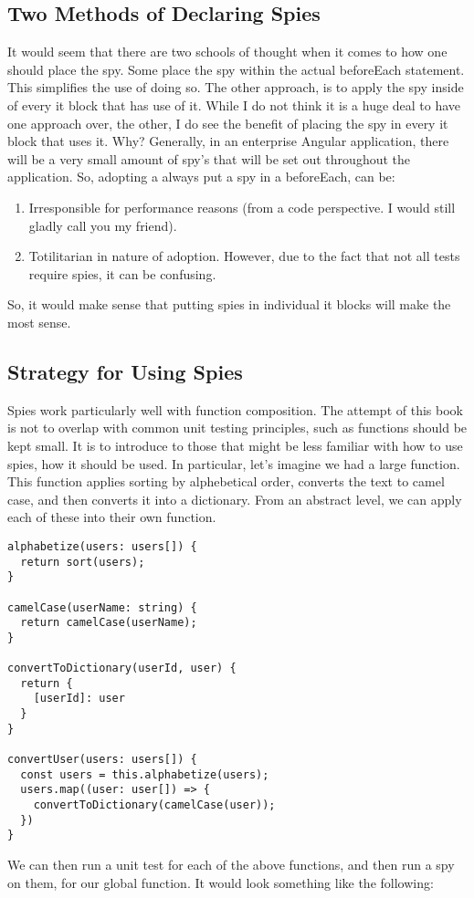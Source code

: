 \subsection{ Two Methods of Declaring Spies }
It would seem that there are two schools of thought when it comes to how one should
place the spy. Some place the spy within the actual beforeEach statement. This
simplifies the use of doing so. The other approach, is to apply the spy inside of
every it block that has use of it. While I do not think it is a huge deal to have
one approach over, the other, I do see the benefit of placing the spy in every
it block that uses it. Why? Generally, in an enterprise Angular application,
there will be a very small amount of spy's that will be set out throughout the
application. So, adopting a always put a spy in a beforeEach, can be:
\begin{enumerate}
  \item Irresponsible for performance reasons (from a code perspective. I would still gladly call you my friend).
  \item Totilitarian in nature of adoption. However, due to the fact that not
  all tests require spies, it can be confusing.
\end{enumerate}

So, it would make sense that putting spies in individual it blocks will make the
most sense.

\subsection{ Strategy for Using Spies }
Spies work particularly well with function composition. The attempt of this book
is not to overlap with common unit testing principles, such as functions should
be kept small. It is to introduce to those that might be less familiar with how
to use spies, how it should be used. In particular, let's imagine we had a large
function. This function applies sorting by alphebetical order, converts the text
to camel case, and then converts it into a dictionary. From an abstract level,
we can apply each of these into their own function.

\begin{lstlisting}
alphabetize(users: users[]) {
  return sort(users);
}

camelCase(userName: string) {
  return camelCase(userName);
}

convertToDictionary(userId, user) {
  return {
    [userId]: user
  }
}

convertUser(users: users[]) {
  const users = this.alphabetize(users);
  users.map((user: user[]) => {
    convertToDictionary(camelCase(user));
  })
}
\end{lstlisting}


We can then run a unit test for each of the above functions, and then run a spy
on them, for our global function. It would look something like the following:
